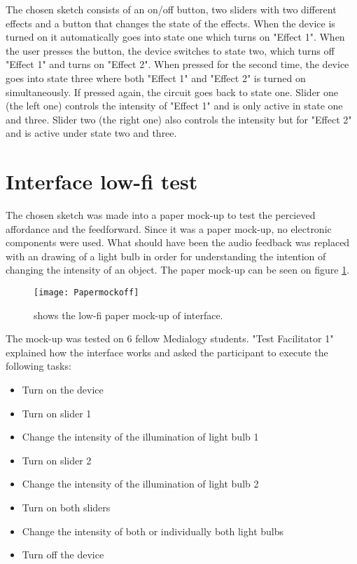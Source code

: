 The chosen sketch consists of an on/off button, two sliders with two different effects and a button that changes the state of the effects. When the device is turned on it automatically goes into state one which turns on "Effect 1". When the user presses the button, the device switches to state two, which turns off "Effect 1" and turns on "Effect 2". When pressed for the second time, the device goes into state three where both "Effect 1" and "Effect 2" is turned on simultaneously. If pressed again, the circuit goes back to state one. Slider one (the left one) controls the intensity of "Effect 1" and is only active in state one and three. Slider two (the right one) also controls the intensity but for "Effect 2" and is active under state two and three.

\section{Interface low-fi test}\label{sec:lowfitest}
The chosen sketch was made into a paper mock-up to test the percieved affordance and the feedforward. Since it was a paper mock-up, no electronic components were used. What should have been the audio feedback was replaced with an drawing of a light bulb in order for understanding the intention of changing the intensity of an object. The paper mock-up can be seen on figure \ref{fig:Papermockoff}.

\begin{figure}[!h] 
\centering
\texttt{[image: Papermockoff]}
\caption{\label{fig:Papermockoff} shows the low-fi paper mock-up of interface.}
\end{figure}

The mock-up was tested on 6 fellow Medialogy students. "Test Facilitator 1" explained how the interface works and asked the participant to execute the following tasks:

\begin{itemize}
\item Turn on the device
\item Turn on slider 1
\item Change the intensity of the illumination of light bulb 1
\item Turn on slider 2
\item Change the intensity of the illumination of light bulb 2
\item Turn on both sliders
\item Change the intensity of both or individually both light bulbs
\item Turn off the device
\end{itemize}

